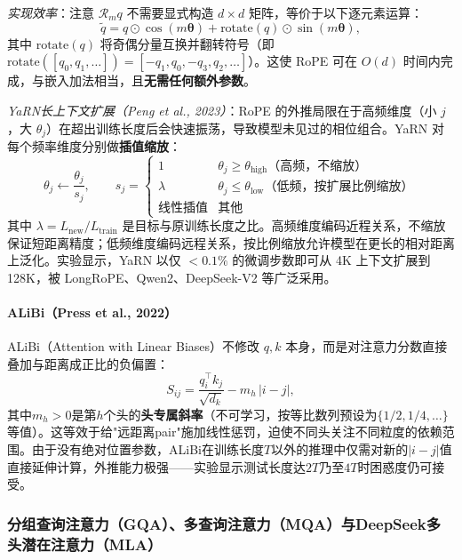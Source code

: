 \documentclass[12pt,a4paper]{article}
\begin{document}
\textit{实现效率}：注意 $\mathcal{R}_m q$ 不需要显式构造 $d\times d$ 矩阵，等价于以下逐元素运算：
\begin{equation}
\tilde{q} = q \odot \cos(m\boldsymbol{\theta}) + \text{rotate}(q) \odot \sin(m\boldsymbol{\theta}),
\end{equation}
其中 $\text{rotate}(q)$ 将奇偶分量互换并翻转符号（即 $\text{rotate}([q_0, q_1, \ldots]) = [-q_1, q_0, -q_3, q_2, \ldots]$）。这使 RoPE 可在 $O(d)$ 时间内完成，与嵌入加法相当，且\textbf{无需任何额外参数}。

\textit{YaRN长上下文扩展（Peng et al., 2023）}：RoPE 的外推局限在于高频维度（小 $j$，大 $\theta_j$）在超出训练长度后会快速振荡，导致模型未见过的相位组合。YaRN 对每个频率维度分别做\textbf{插值缩放}：
\begin{equation}
\theta_j \leftarrow \frac{\theta_j}{s_j},\qquad
s_j = \begin{cases}
1 & \theta_j \ge \theta_{\text{high}} \text{（高频，不缩放）}\\
\lambda & \theta_j \le \theta_{\text{low}} \text{（低频，按扩展比例缩放）}\\
\text{线性插值} & \text{其他}
\end{cases}
\end{equation}
其中 $\lambda = L_{\text{new}}/L_{\text{train}}$ 是目标与原训练长度之比。高频维度编码近程关系，不缩放保证短距离精度；低频维度编码远程关系，按比例缩放允许模型在更长的相对距离上泛化。实验显示，YaRN 以仅 $<0.1\%$ 的微调步数即可从 4K 上下文扩展到 128K，被 LongRoPE、Qwen2、DeepSeek-V2 等广泛采用。

\paragraph{ALiBi（Press et al., 2022）}

ALiBi（Attention with Linear Biases）不修改 $q, k$ 本身，而是对注意力分数直接叠加与距离成正比的负偏置：
\begin{equation}
S_{ij} = \frac{q_i^\top k_j}{\sqrt{d_k}} - m_h\,|i - j|,
\end{equation}
其中$m_h > 0$是第$h$个头的\textbf{头专属斜率}（不可学习，按等比数列预设为$\{1/2, 1/4, \ldots\}$等值）。这等效于给"远距离pair"施加线性惩罚，迫使不同头关注不同粒度的依赖范围。由于没有绝对位置参数，ALiBi在训练长度$T$以外的推理中仅需对新的$|i-j|$值直接延伸计算，外推能力极强——实验显示测试长度达$2T$乃至$4T$时困惑度仍可接受。

\subsubsection{分组查询注意力（GQA）、多查询注意力（MQA）与DeepSeek多头潜在注意力（MLA）}
\label{sec:gqa}
\end{document}
